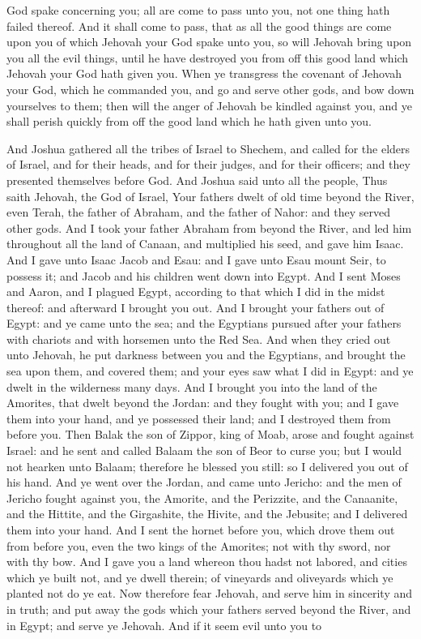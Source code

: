 God spake concerning you; all are come to pass unto you, not one thing hath failed thereof. And it shall come to pass, that as all the good things are come upon you of which Jehovah your God spake unto you, so will Jehovah bring upon you all the evil things, until he have destroyed you from off this good land which Jehovah your God hath given you. When ye transgress the covenant of Jehovah your God, which he commanded you, and go and serve other gods, and bow down yourselves to them; then will the anger of Jehovah be kindled against you, and ye shall perish quickly from off the good land which he hath given unto you. 

And Joshua gathered all the tribes of Israel to Shechem, and called for the elders of Israel, and for their heads, and for their judges, and for their officers; and they presented themselves before God. And Joshua said unto all the people, Thus saith Jehovah, the God of Israel, Your fathers dwelt of old time beyond the River, even Terah, the father of Abraham, and the father of Nahor: and they served other gods. And I took your father Abraham from beyond the River, and led him throughout all the land of Canaan, and multiplied his seed, and gave him Isaac. And I gave unto Isaac Jacob and Esau: and I gave unto Esau mount Seir, to possess it; and Jacob and his children went down into Egypt. And I sent Moses and Aaron, and I plagued Egypt, according to that which I did in the midst thereof: and afterward I brought you out. And I brought your fathers out of Egypt: and ye came unto the sea; and the Egyptians pursued after your fathers with chariots and with horsemen unto the Red Sea. And when they cried out unto Jehovah, he put darkness between you and the Egyptians, and brought the sea upon them, and covered them; and your eyes saw what I did in Egypt: and ye dwelt in the wilderness many days. And I brought you into the land of the Amorites, that dwelt beyond the Jordan: and they fought with you; and I gave them into your hand, and ye possessed their land; and I destroyed them from before you. Then Balak the son of Zippor, king of Moab, arose and fought against Israel: and he sent and called Balaam the son of Beor to curse you; but I would not hearken unto Balaam; therefore he blessed you still: so I delivered you out of his hand. And ye went over the Jordan, and came unto Jericho: and the men of Jericho fought against you, the Amorite, and the Perizzite, and the Canaanite, and the Hittite, and the Girgashite, the Hivite, and the Jebusite; and I delivered them into your hand. And I sent the hornet before you, which drove them out from before you, even the two kings of the Amorites; not with thy sword, nor with thy bow. And I gave you a land whereon thou hadst not labored, and cities which ye built not, and ye dwell therein; of vineyards and oliveyards which ye planted not do ye eat.  Now therefore fear Jehovah, and serve him in sincerity and in truth; and put away the gods which your fathers served beyond the River, and in Egypt; and serve ye Jehovah. And if it seem evil unto you to 